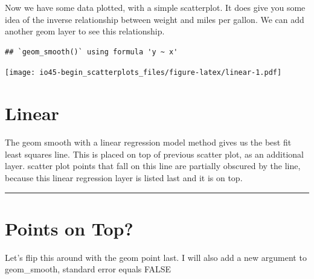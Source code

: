 \documentclass[
]{book}
\newenvironment{Shaded}{\begin{snugshade}}{\end{snugshade}}
\newcommand{\DataTypeTok}[1]{\textcolor[rgb]{0.13,0.29,0.53}{#1}}
\newcommand{\KeywordTok}[1]{\textcolor[rgb]{0.13,0.29,0.53}{\textbf{#1}}}
\newcommand{\NormalTok}[1]{#1}
\newcommand{\OperatorTok}[1]{\textcolor[rgb]{0.81,0.36,0.00}{\textbf{#1}}}
\newcommand{\OtherTok}[1]{\textcolor[rgb]{0.56,0.35,0.01}{#1}}
\newcommand{\StringTok}[1]{\textcolor[rgb]{0.31,0.60,0.02}{#1}}
\begin{document}
Now we have some data plotted, with a simple scatterplot. It does give you some idea of the inverse relationship between weight and miles per gallon. We can add another geom layer to see this relationship.

\begin{Shaded}
\end{Shaded}

\begin{verbatim}
## `geom_smooth()` using formula 'y ~ x'
\end{verbatim}

\texttt{[image: io45-begin\_scatterplots\_files/figure-latex/linear-1.pdf]}

\hypertarget{linear}{%
\chapter{Linear}\label{linear}}

The geom smooth with a linear regression model method gives us the best fit least squares line. This is placed on top of previous scatter plot, as an additional layer. scatter plot points that fall on this line are partially obscured by the line, because this linear regression layer is listed last and it is on top.

\begin{center}\rule{0.5\linewidth}{0.5pt}\end{center}

\hypertarget{points-on-top}{%
\chapter{Points on Top?}\label{points-on-top}}

Let's flip this around with the geom point last. I will also add a new argument to geom\_smooth, standard error equals FALSE

\begin{Shaded}
\end{Shaded}
\end{document}
